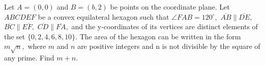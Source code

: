 Let $A=(0,0)$ and $B=(b,2)$ be points on the coordinate plane. Let $ABCDEF$ be a convex equilateral hexagon such that $\angle FAB=120^\circ,$ $\overline{AB}\parallel \overline{DE},$ $\overline{BC}\parallel \overline{EF,}$ $\overline{CD}\parallel \overline{FA},$ and the y-coordinates of its vertices are distinct elements of the set $\{0,2,4,6,8,10\}.$ The area of the hexagon can be written in the form $m\sqrt{n},$ where $m$ and $n$ are positive integers and n is not divisible by the square of any prime. Find $m+n.$